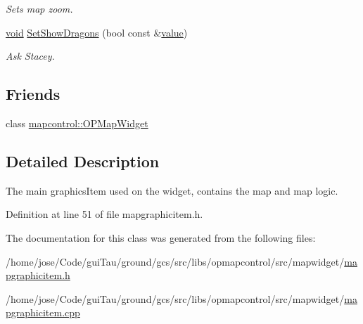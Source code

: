 \begin{DoxyCompactItemize}
\begin{DoxyCompactList}\small\item\em Sets map zoom. \end{DoxyCompactList}\item 
\hyperlink{group___u_a_v_objects_plugin_ga444cf2ff3f0ecbe028adce838d373f5c}{void} \hyperlink{group___o_p_map_widget_gaf6a44ff6d44e64585620480128100737}{Set\-Show\-Dragons} (bool const \&\hyperlink{glext_8h_aa0e2e9cea7f208d28acda0480144beb0}{value})
\begin{DoxyCompactList}\small\item\em Ask Stacey. \end{DoxyCompactList}\end{DoxyCompactItemize}
\subsection*{Friends}
\begin{DoxyCompactItemize}
\item 
class \hyperlink{group___o_p_map_widget_gaab6f3be35d4d41ee35530f402954d903}{mapcontrol\-::\-O\-P\-Map\-Widget}
\end{DoxyCompactItemize}


\subsection{Detailed Description}
The main graphics\-Item used on the widget, contains the map and map logic. 

Definition at line 51 of file mapgraphicitem.\-h.



The documentation for this class was generated from the following files\-:\begin{DoxyCompactItemize}
\item 
/home/jose/\-Code/gui\-Tau/ground/gcs/src/libs/opmapcontrol/src/mapwidget/\hyperlink{mapgraphicitem_8h}{mapgraphicitem.\-h}\item 
/home/jose/\-Code/gui\-Tau/ground/gcs/src/libs/opmapcontrol/src/mapwidget/\hyperlink{mapgraphicitem_8cpp}{mapgraphicitem.\-cpp}\end{DoxyCompactItemize}
